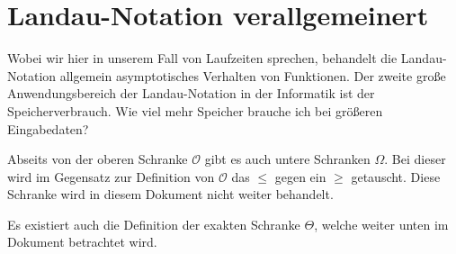 \section{Landau-Notation verallgemeinert}
%
Wobei wir hier in unserem Fall von Laufzeiten sprechen, behandelt die Landau-Notation allgemein asymptotisches Verhalten von Funktionen. Der zweite große Anwendungsbereich der Landau-Notation in der Informatik ist der Speicherverbrauch. Wie viel mehr Speicher brauche ich bei größeren Eingabedaten?

Abseits von der oberen Schranke $\mathcal{O}$ gibt es auch untere Schranken $\Omega$. Bei dieser wird im Gegensatz zur Definition von $\mathcal{O}$ das $\leq$ gegen ein $\geq$ getauscht. Diese Schranke wird in diesem Dokument nicht weiter behandelt.

Es existiert auch die Definition der exakten Schranke $\Theta$, welche weiter unten im Dokument betrachtet wird.

